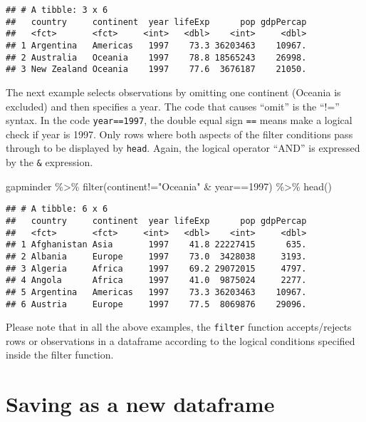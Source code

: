 \documentclass[
]{book}
\newenvironment{Shaded}{\begin{snugshade}}{\end{snugshade}}
\newcommand{\DecValTok}[1]{\textcolor[rgb]{0.00,0.00,0.81}{#1}}
\newcommand{\FunctionTok}[1]{\textcolor[rgb]{0.00,0.00,0.00}{#1}}
\newcommand{\NormalTok}[1]{#1}
\newcommand{\SpecialCharTok}[1]{\textcolor[rgb]{0.00,0.00,0.00}{#1}}
\newcommand{\StringTok}[1]{\textcolor[rgb]{0.31,0.60,0.02}{#1}}
\begin{document}
\begin{verbatim}
## # A tibble: 3 x 6
##   country     continent  year lifeExp      pop gdpPercap
##   <fct>       <fct>     <int>   <dbl>    <int>     <dbl>
## 1 Argentina   Americas   1997    73.3 36203463    10967.
## 2 Australia   Oceania    1997    78.8 18565243    26998.
## 3 New Zealand Oceania    1997    77.6  3676187    21050.
\end{verbatim}

The next example selects observations by omitting one continent (Oceania is excluded) and then specifies a year. The code that causes ``omit'' is the ``!='' syntax. In the code \texttt{year==1997}, the double equal sign \texttt{==} means make a logical check if year is 1997. Only rows where both aspects of the filter conditions pass through to be displayed by \texttt{head}. Again, the logical operator ``AND'' is expressed by the \texttt{\&} expression.

\begin{Shaded}
\begin{Highlighting}[]
\NormalTok{gapminder }\SpecialCharTok{\%\textgreater{}\%} 
  \FunctionTok{filter}\NormalTok{(continent}\SpecialCharTok{!=}\StringTok{"Oceania"} \SpecialCharTok{\&}\NormalTok{ year}\SpecialCharTok{==}\DecValTok{1997}\NormalTok{) }\SpecialCharTok{\%\textgreater{}\%} 
  \FunctionTok{head}\NormalTok{()}
\end{Highlighting}
\end{Shaded}

\begin{verbatim}
## # A tibble: 6 x 6
##   country     continent  year lifeExp      pop gdpPercap
##   <fct>       <fct>     <int>   <dbl>    <int>     <dbl>
## 1 Afghanistan Asia       1997    41.8 22227415      635.
## 2 Albania     Europe     1997    73.0  3428038     3193.
## 3 Algeria     Africa     1997    69.2 29072015     4797.
## 4 Angola      Africa     1997    41.0  9875024     2277.
## 5 Argentina   Americas   1997    73.3 36203463    10967.
## 6 Austria     Europe     1997    77.5  8069876    29096.
\end{verbatim}

Please note that in all the above examples, the \texttt{filter} function accepts/rejects rows or observations in a dataframe according to the logical conditions specified inside the filter function.

\hypertarget{saving-as-a-new-dataframe}{%
\section{Saving as a new dataframe}\label{saving-as-a-new-dataframe}}
\end{document}
